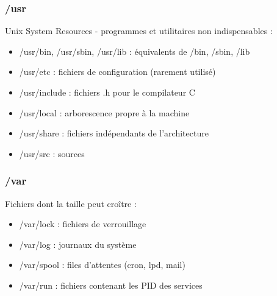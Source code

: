 \documentclass[12pt,a4paper]{article}
\begin{document}

\subsubsection{/usr}
Unix System Resources - programmes et utilitaires non indispensables :
\begin{itemize}
    \item /usr/bin, /usr/sbin, /usr/lib : \'equivalents de /bin, /sbin, /lib %
    \item /usr/etc : fichiers de configuration (rarement utilis\'e) %
    \item /usr/include : fichiers .h pour le compilateur C %
    \item /usr/local : arborescence propre \`a la machine %
    \item /usr/share : fichiers ind\'ependants de l'architecture %
    \item /usr/src : sources %
\end{itemize}


\subsubsection{/var}
Fichiers dont la taille peut cro\^itre :
\begin{itemize}
    \item /var/lock : fichiers de verrouillage %
    \item /var/log : journaux du syst\`eme %
    \item /var/spool : files d'attentes (cron, lpd, mail) %
    \item /var/run : fichiers contenant les PID des services %
\end{itemize}
\end{document}

